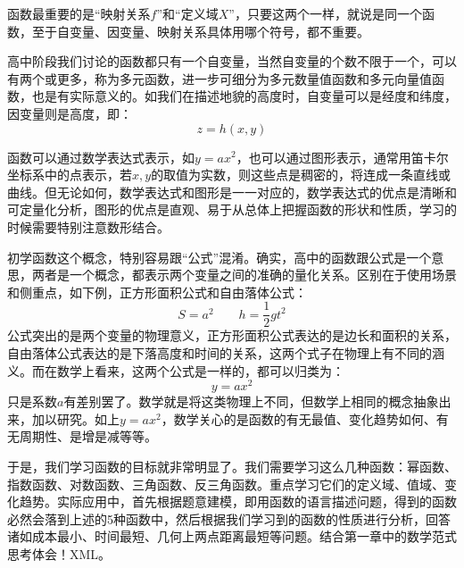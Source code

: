 函数最重要的是“映射关系$f$”和“定义域$X$”，只要这两个一样，就说是同一个函数，至于自变量、因变量、映射关系具体用哪个符号，都不重要。

高中阶段我们讨论的函数都只有一个自变量，当然自变量的个数不限于一个，可以有两个或更多，称为多元函数，进一步可细分为多元数量值函数和多元向量值函数，也是有实际意义的。如我们在描述地貌的高度时，自变量可以是经度和纬度，因变量则是高度，即：
\[
z=h\left( x,y \right)
\]

函数可以通过数学表达式表示，如$y=ax^2$，也可以通过图形表示，通常用笛卡尔坐标系中的点表示，若$x,y$的取值为实数，则这些点是稠密的，将连成一条直线或曲线。但无论如何，数学表达式和图形是一一对应的，数学表达式的优点是清晰和可定量化分析，图形的优点是直观、易于从总体上把握函数的形状和性质，学习的时候需要特别注意数形结合。

\begin{tcolorbox}
初学函数这个概念，特别容易跟“公式”混淆。确实，高中的函数跟公式是一个意思，两者是一个概念，都表示两个变量之间的准确的量化关系。区别在于使用场景和侧重点，如下例，正方形面积公式和自由落体公式：
\[
S=a^2 \qquad h=\frac{1}{2}gt^2
\]
公式突出的是两个变量的物理意义，正方形面积公式表达的是边长和面积的关系，自由落体公式表达的是下落高度和时间的关系，这两个式子在物理上有不同的涵义。而在数学上看来，这两个公式是一样的，都可以归类为：
\[
y=ax^2
\]
只是系数$a$有差别罢了。数学就是将这类物理上不同，但数学上相同的概念抽象出来，加以研究。如上$y=ax^2$，数学关心的是函数的有无最值、变化趋势如何、有无周期性、是增是减等等。
\end{tcolorbox}

\begin{tcolorbox}
于是，我们学习函数的目标就非常明显了。我们需要学习这么几种函数：幂函数、指数函数、对数函数、三角函数、反三角函数。重点学习它们的定义域、值域、变化趋势。实际应用中，首先根据题意建模，即用函数的语言描述问题，得到的函数必然会落到上述的5种函数中，然后根据我们学习到的函数的性质进行分析，回答诸如成本最小、时间最短、几何上两点距离最短等问题。结合第一章中的数学范式思考体会！XML。
\end{tcolorbox}




